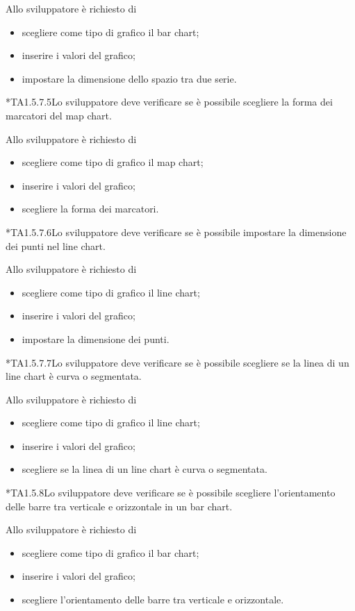 		Allo sviluppatore è richiesto di
		\begin{itemize}
			\item scegliere come tipo di grafico il bar chart;
			\item inserire i valori del grafico;
			\item impostare la dimensione dello spazio tra due serie.
		\end{itemize}

	*{TA1.5.7.5}Lo sviluppatore deve verificare se è possibile scegliere la forma dei marcatori del map chart.

		Allo sviluppatore è richiesto di
		\begin{itemize}
			\item scegliere come tipo di grafico il map chart;
			\item inserire i valori del grafico;
			\item scegliere la forma dei marcatori.
		\end{itemize}

	*{TA1.5.7.6}Lo sviluppatore deve verificare se è possibile impostare la dimensione dei punti nel line chart.

		Allo sviluppatore è richiesto di
		\begin{itemize}
			\item scegliere come tipo di grafico il line chart;
			\item inserire i valori del grafico;
			\item impostare la dimensione dei punti.
		\end{itemize}

	*{TA1.5.7.7}Lo sviluppatore deve verificare se è possibile scegliere se la linea di un line chart è curva o segmentata.

		Allo sviluppatore è richiesto di
		\begin{itemize}
			\item scegliere come tipo di grafico il line chart;
			\item inserire i valori del grafico;
			\item scegliere se la linea di un line chart è curva o segmentata.
		\end{itemize}

	*{TA1.5.8}Lo sviluppatore deve verificare se è possibile scegliere l'orientamento delle barre tra verticale e orizzontale in un bar chart.

		Allo sviluppatore è richiesto di
		\begin{itemize}
			\item scegliere come tipo di grafico il bar chart;
			\item inserire i valori del grafico;
			\item scegliere l'orientamento delle barre tra verticale e orizzontale.
		\end{itemize}

